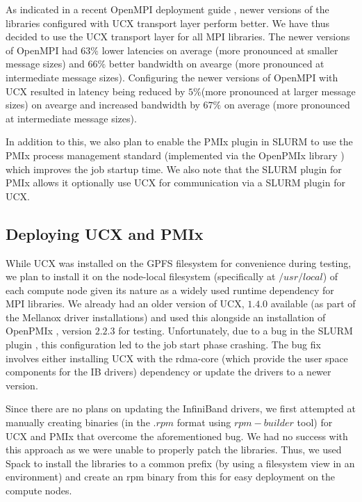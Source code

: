 \documentclass[manuscript,screen]{acmart}
\begin{document}
As indicated in a recent OpenMPI deployment guide \cite{openmpi_deployment_tuning}, newer versions of the libraries  configured with UCX transport layer perform better. We have thus decided to use the UCX transport layer for all MPI libraries. The newer versions of OpenMPI had $63\%$ lower latencies on average (more pronounced at smaller message sizes) and $66\%$ better bandwidth on avearge (more pronounced at intermediate message sizes). Configuring the newer versions of OpenMPI with UCX resulted in latency being reduced by $5\%$(more pronounced at larger message sizes) on avearge and increased bandwidth by $67\%$ on average (more pronounced at intermediate message sizes).

In addition to this, we also plan to enable the PMIx plugin \cite{slurm_pmix_sc17,slurm_pmix_2019} in SLURM to use the PMIx process management standard \cite{pmix,pmix_website} (implemented via the OpenPMIx library \cite{openpmix_website}) which improves the job startup time. We also note that the SLURM plugin for PMIx allows it optionally use UCX for communication via a SLURM plugin for UCX.

\subsection{Deploying UCX and PMIx}
While UCX was installed on the GPFS filesystem for convenience during testing, we plan to install it on the node-local filesystem (specifically at $/usr/local$) of each compute node given its nature as a widely used runtime dependency for MPI libraries. We already had an older version of UCX, $1.4.0$ available (as part of the Mellanox driver installations) and used this alongside an installation of OpenPMIx \cite{openpmix_website}, version $2.2.3$ for testing. Unfortunately, due to a bug in the SLURM plugin \cite{slurm_ucx_bug}, this configuration led to the job start phase crashing. The bug fix involves either installing UCX with the rdma-core \cite{rdmacore_repository}(which provide the user space components for the IB drivers) dependency or update the drivers to a newer version.

Since there are no plans on updating the InfiniBand drivers, we first attempted at manually creating binaries (in the $.rpm$ format using $rpm-builder$ tool) for UCX and PMIx that overcome the aforementioned bug. We had no success with this approach as we were unable to properly patch the libraries. Thus, we used Spack \cite{spack} to install the libraries to a common prefix (by using a filesystem view in an environment) and create an rpm binary from this for easy deployment on the compute nodes.
\end{document}
